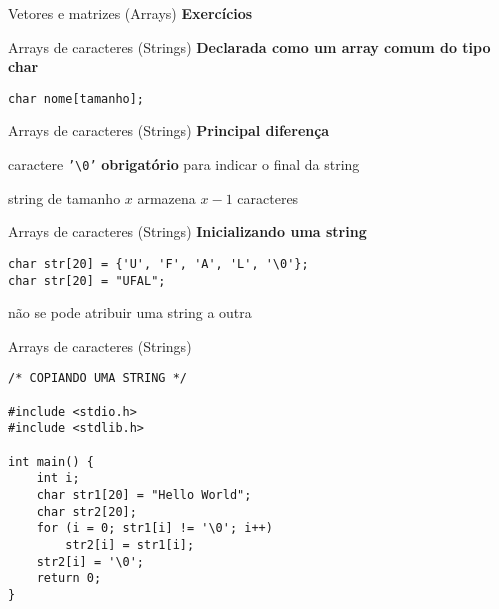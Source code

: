 \documentclass[10pt]{beamer}
\begin{document}
\begin{frame}{Vetores e matrizes (Arrays)}
    \huge \textbf{Exercícios}
\end{frame}

\begin{frame}[fragile]{Arrays de caracteres (Strings)}
    \huge
    \textbf{Declarada como um array comum do tipo char}
    
    \bigskip
    
    \begin{verbatim}
char nome[tamanho];
    \end{verbatim}
\end{frame}

\begin{frame}{Arrays de caracteres (Strings)}
    \huge
    \textbf{Principal diferença}
    
    \bigskip
    
    caractere \texttt{'\textbackslash 0'} \textbf{obrigatório} para indicar o final da string
    
    \vfill
    
    \Large
    string de tamanho $x$ armazena $x - 1$ caracteres
\end{frame}

\begin{frame}[fragile]{Arrays de caracteres (Strings)}
    \huge
    \textbf{Inicializando uma string}
    
    \bigskip
    
    \large
    \begin{verbatim}
char str[20] = {'U', 'F', 'A', 'L', '\0'};
char str[20] = "UFAL";
    \end{verbatim}
    
    \vfill
    
    \Large
    não se pode atribuir uma string a outra \faExclamationTriangle
\end{frame}

\begin{frame}[fragile]{Arrays de caracteres (Strings)}
    \begin{verbatim}
/* COPIANDO UMA STRING */
    
#include <stdio.h>
#include <stdlib.h>

int main() {
    int i;
    char str1[20] = "Hello World";
    char str2[20];
    for (i = 0; str1[i] != '\0'; i++)
        str2[i] = str1[i];
    str2[i] = '\0';
    return 0;
}
    \end{verbatim}
\end{frame}
\end{document}
